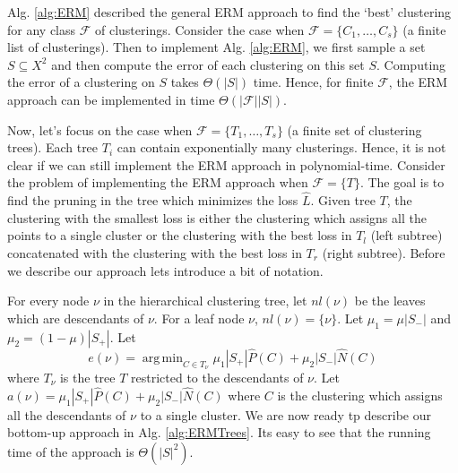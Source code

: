 \documentclass[12pt]{article}
\newcommand{\mc}{\mathcal}
\DeclareMathOperator*{\argmin}{arg\,min}
\begin{document}
Alg. \ref{alg:ERM} described the general ERM approach to find the `best' clustering for any class $\mc F$ of clusterings. Consider the case when $\mc F = \{C_1, \ldots, C_s\}$ (a finite list of clusterings). Then to implement Alg. \ref{alg:ERM}, we first sample a set $S \subseteq X^2$ and then compute the error of each clustering on this set $S$. Computing the error of a clustering on $S$ takes $\Theta(|S|)$ time. Hence, for finite $\mc F$, the ERM approach can be implemented in time $\Theta(|\mc F| |S|)$. 

Now, let's focus on the case when $\mc F = \{T_1, \ldots, T_s\}$ (a finite set of clustering trees). Each tree $T_i$ can contain exponentially many clusterings. Hence, it is not clear if we can still implement the ERM approach in polynomial-time. Consider the problem of implementing the ERM approach when $\mc F = \{T\}$. The goal is to find the pruning in the tree which minimizes the loss $\hat L$. Given tree $T$, the clustering with the smallest loss is either the clustering which assigns all the points to a single cluster or the clustering with the best loss in $T_l$ (left subtree) concatenated with the clustering with the best loss in $T_r$ (right subtree). Before we describe our approach lets introduce a bit of notation.

For every node $\nu$ in the hierarchical clustering tree, let $nl(\nu)$ be the leaves which are descendants of $\nu$. For a leaf node $\nu$, $nl(\nu) = \{\nu\}$. Let $\mu_1 = \mu|S_-|$ and $\mu_2 = (1-\mu)|S_+|$. Let $$e(\nu) = \argmin_{C \in T_{\nu}} \mu_1|S_+|\hat P(C) + \mu_2|S_-|\hat N(C)$$ where $T_{\nu}$ is the tree $T$ restricted to the descendants of $\nu$. Let $a(\nu) = \mu_1|S_+|\hat P(C) + \mu_2|S_-|\hat N(C)$ where $C$ is the clustering which assigns all the descendants of $\nu$ to a single cluster. We are now ready tp describe our bottom-up approach in Alg. \ref{alg:ERMTrees}. Its easy to see that the running time of the approach is $\Theta(|S|^2)$. 

\ifdefined\COMPLETE
\else
\end{document}
